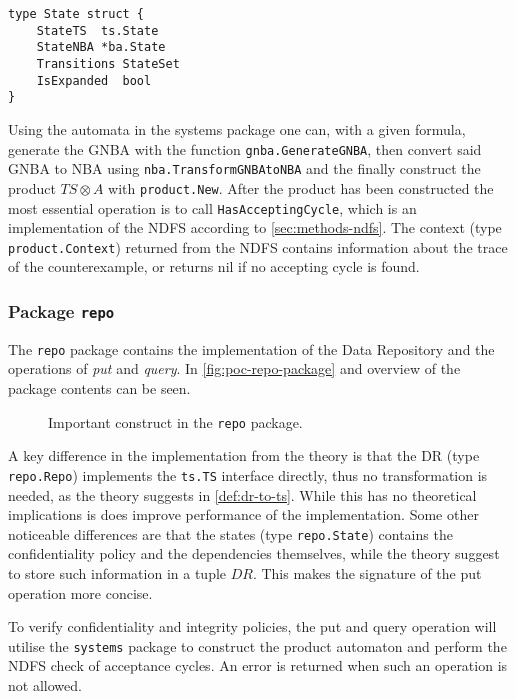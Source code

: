 \begin{lstlisting}[language=Golang, caption={Definition of \texttt{product.State}.}, label={lst:product-state}, floatplacement=H]
type State struct {
    StateTS  ts.State
    StateNBA *ba.State
    Transitions StateSet
    IsExpanded  bool
}
\end{lstlisting}

Using the automata in the systems package one can, with a given formula, generate the GNBA with the function \verb=gnba.GenerateGNBA=, then convert said GNBA to NBA using \verb=nba.TransformGNBAtoNBA= and the finally construct the product $TS\otimes A$ with \verb=product.New=. After the product has been constructed the most essential operation is to call \verb=HasAcceptingCycle=, which is an implementation of the NDFS according to \autoref{sec:methods-ndfs}. The context (type \verb=product.Context=) returned from the NDFS contains information about the trace of the counterexample, or returns nil if no accepting cycle is found.

\subsubsection{Package \texttt{repo}}
The \verb=repo= package contains the implementation of the Data Repository and the operations of \emph{put} and \emph{query}. In \autoref{fig:poc-repo-package} and overview of the package contents can be seen.
\begin{figure}
    \caption{Important construct in the \texttt{repo} package.}
    \label{fig:poc-repo-package}
\end{figure}
A key difference in the implementation from the theory is that the DR (type \verb=repo.Repo=) implements the \verb=ts.TS= interface directly, thus no transformation is needed, as the theory suggests in \autoref{def:dr-to-ts}. While this has no theoretical implications is does improve performance of the implementation. Some other noticeable differences are that the states (type \verb=repo.State=) contains the confidentiality policy and the dependencies themselves, while the theory suggest to store such information in a tuple $DR$. This makes the signature of the put operation more concise.

To verify confidentiality and integrity policies, the put and query operation will utilise the \verb=systems= package to construct the product automaton and perform the NDFS check of acceptance cycles. An error is returned when such an operation is not allowed.
